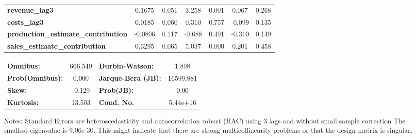 \begin{center}
\begin{tabular}{lcccccc}
\textbf{revenue\_lag3}                      &       0.1675  &        0.051     &     3.258  &         0.001        &        0.067    &        0.268     \\
\textbf{costs\_lag3}                        &       0.0185  &        0.060     &     0.310  &         0.757        &       -0.099    &        0.135     \\
\textbf{production\_estimate\_contribution} &      -0.0806  &        0.117     &    -0.688  &         0.491        &       -0.310    &        0.149     \\
\textbf{sales\_estimate\_contribution}      &       0.3295  &        0.065     &     5.037  &         0.000        &        0.201    &        0.458     \\
\bottomrule
\end{tabular}
\begin{tabular}{lclc}
\textbf{Omnibus:}       & 666.549 & \textbf{  Durbin-Watson:     } &     1.898  \\
\textbf{Prob(Omnibus):} &   0.000 & \textbf{  Jarque-Bera (JB):  } & 16599.881  \\
\textbf{Skew:}          &  -0.129 & \textbf{  Prob(JB):          } &      0.00  \\
\textbf{Kurtosis:}      &  13.503 & \textbf{  Cond. No.          } &  5.44e+16  \\
\bottomrule
\end{tabular}
\end{center}

Notes: \newline
 [1] Standard Errors are heteroscedasticity and autocorrelation robust (HAC) using 3 lags and without small sample correction \newline
 [2] The smallest eigenvalue is 9.06e-30. This might indicate that there are \newline
 strong multicollinearity problems or that the design matrix is singular.